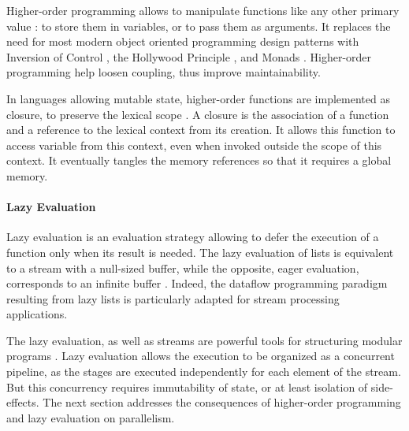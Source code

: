 Higher-order programming allows to manipulate functions like any other primary value : to store them in variables, or to pass them as arguments.
It replaces the need for most modern object oriented programming design patterns  with Inversion of Control \cite{Johnson}, the Hollywood Principle \cite{Sweet1985}, and Monads \cite{Wadler1992}.
Higher-order programming help loosen coupling, thus improve maintainability.

In languages allowing mutable state, higher-order functions are implemented as closure, to preserve the lexical scope \cite{Sussman1998}.
A closure is the association of a function and a reference to the lexical context from its creation.
It allows this function to access variable from this context, even when invoked outside the scope of this context.
It eventually tangles the memory references so that it requires a global memory.

\paragraph{Lazy Evaluation}

Lazy evaluation is an evaluation strategy allowing to defer the execution of a function only when its result is needed.
The lazy evaluation of lists is equivalent to a stream with a null-sized buffer, while the opposite, eager evaluation, corresponds to an infinite buffer \cite{VanRoy2003}.
Indeed, the dataflow programming paradigm resulting from lazy lists is particularly adapted for stream processing applications.

The lazy evaluation, as well as streams are powerful tools for structuring modular programs \cite{Sussman1983}.
Lazy evaluation allows the execution to be organized as a concurrent pipeline, as the stages are executed independently for each element of the stream.
But this concurrency requires immutability of state, or at least isolation of side-effects.
The next section addresses the consequences of higher-order programming and lazy evaluation on parallelism.



\paragraph{}

